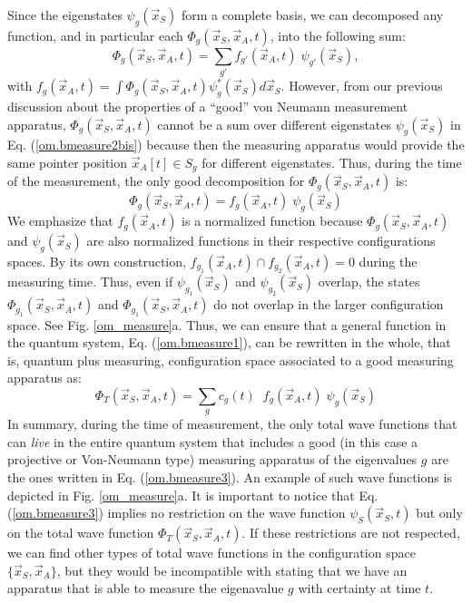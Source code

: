 \documentclass[nofootinbib, secnumarabic, amsmath, nobibnotes,10pt,aps,pra]{revtex4-1}
\newcommand{\fref}[1]{Fig. \ref{#1}}
\newcommand{\eref}[1]{Eq. (\ref{#1})}
\begin{document}
Since the eigenstates $\psi_g(\vec x_S)$ form a complete basis, we can decomposed any function, and in particular each $\Phi_g(\vec x_S,\vec x_A,t)$, into the following sum:
\begin{equation}
\Phi_g(\vec x_S,\vec x_A,t) = \sum_{g'} f_{g'}(\vec x_A,t) \; \psi_{g'}(\vec x_S)
\label{om.bmeasure2bis},
\end{equation}
with $ f_g(\vec x_A,t) = \int \Phi_g(\vec x_S,\vec x_A,t)
\psi^*_g(\vec x_S) d\vec x_S$. However, from our previous discussion
about the properties of a ``good'' von Neumann measurement
apparatus, $\Phi_g(\vec x_S,\vec x_A,t)$ cannot be a sum over
different eigenstates $\psi_g(\vec x_S)$ in \eref{om.bmeasure2bis}
because then the measuring apparatus would provide the same pointer
position $\vec x_A[t]\in S_{g}$ for different eigenstates. Thus, during the time of the measurement, the
only good decomposition for $\Phi_g(\vec x_S,\vec x_A,t)$ is:
\begin{equation}
\Phi_g(\vec x_S,\vec x_A,t) = f_g(\vec x_A,t) \; \psi_g(\vec x_S)
\label{om.bmeasure2}
\end{equation}
We emphasize that $ f_g(\vec x_A,t)$ is a normalized function because $\Phi_g(\vec x_S,\vec x_A,t)$ and $\psi_g(\vec x_S)$ are also normalized functions in their respective configurations spaces. By its own construction, $f_{g_1}(\vec x_A,t) \cap f_{g_2}(\vec x_A,t) = 0$ during the measuring time. Thus, even if $\psi_{g_1}(\vec x_S)$ and $\psi_{g_2}(\vec x_S)$ overlap, the states $\Phi_{g_1}(\vec x_S,\vec x_A,t)$ and $\Phi_{g_1}(\vec x_S,\vec x_A,t)$ do not overlap in the larger configuration space. See \fref{om_measure}a. Thus, we can ensure that a general function in the quantum system, \eref{om.bmeasure1}, can be rewritten in the whole, that is, quantum plus measuring, configuration space associated to a good measuring apparatus as:
\begin{equation}
\Phi_T(\vec x_S,\vec x_A,t) = \sum_{g} c_g(t) \;\; f_g(\vec x_A,t) \; \psi_g(\vec x_S)
\label{om.bmeasure3}
\end{equation}
In summary, during the time of measurement, the only total wave
functions that can \textit{live} in the entire quantum system that
includes a good (in this case a projective or Von-Neumann type) measuring apparatus of the eigenvalues $g$ are the
ones written in \eref{om.bmeasure3}. An example of such
wave functions is depicted in \fref{om_measure}a. It is important to
notice that \eref{om.bmeasure3} implies no restriction on the wave
function $\psi_S(\vec x_S,t)$ but only on the total wave function
$\Phi_T(\vec x_S,\vec x_A,t)$. If these restrictions are not
respected, we can find other types of total wave functions in the
configuration space $\{\vec x_S,\vec x_A\}$, but they would be
incompatible with stating that we have an apparatus that is able to
measure the eigenavalue $g$ with certainty at time $t$.
\end{document}
